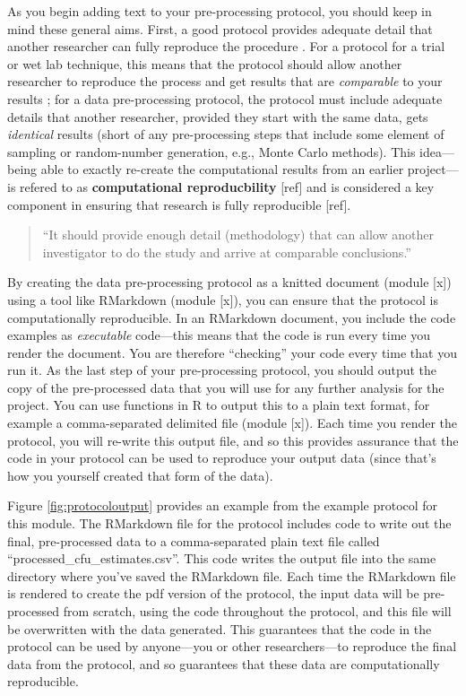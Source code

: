 \documentclass[]{tufte-book}
\begin{document}
As you begin adding text to your pre-processing protocol, you should keep in
mind these general aims. First, a good protocol provides adequate detail that
another researcher can fully reproduce the procedure \citep{al2016protocol}. For a
protocol for a trial or wet lab technique, this means that the protocol should
allow another researcher to reproduce the process and get results that are
\emph{comparable} to your results \citep{al2016protocol}; for a data pre-processing
protocol, the protocol must include adequate details that another researcher,
provided they start with the same data, gets \emph{identical} results (short of any
pre-processing steps that include some element of sampling or random-number
generation, e.g., Monte Carlo methods). This idea---being able to exactly
re-create the computational results from an earlier project---is refered to as
\textbf{computational reproducbility} {[}ref{]} and is considered a key component in
ensuring that research is fully reproducible {[}ref{]}.

\begin{quote}
``It should provide enough detail (methodology) that can allow another
investigator to do the study and arrive at comparable conclusions.''
\citep{al2016protocol}
\end{quote}

By creating the data pre-processing protocol as a knitted document (module {[}x{]})
using a tool like RMarkdown (module {[}x{]}), you can ensure that the protocol is
computationally reproducible. In an RMarkdown document, you include the code
examples as \emph{executable} code---this means that the code is run every time you
render the document. You are therefore ``checking'' your code every time that you
run it. As the last step of your pre-processing protocol, you should output the
copy of the pre-processed data that you will use for any further analysis for
the project. You can use functions in R to output this to a plain text format,
for example a comma-separated delimited file (module {[}x{]}). Each time you render
the protocol, you will re-write this output file, and so this provides assurance
that the code in your protocol can be used to reproduce your output data (since
that's how you yourself created that form of the data).

Figure \ref{fig:protocoloutput} provides an example from the example protocol
for this module. The RMarkdown file for the protocol includes code to write out
the final, pre-processed data to a comma-separated plain text file called
``processed\_cfu\_estimates.csv''. This code writes the output file into the same
directory where you've saved the RMarkdown file. Each time the RMarkdown file is
rendered to create the pdf version of the protocol, the input data will be
pre-processed from scratch, using the code throughout the protocol, and this
file will be overwritten with the data generated. This guarantees that the code
in the protocol can be used by anyone---you or other researchers---to reproduce
the final data from the protocol, and so guarantees that these data are
computationally reproducible.
\end{document}
